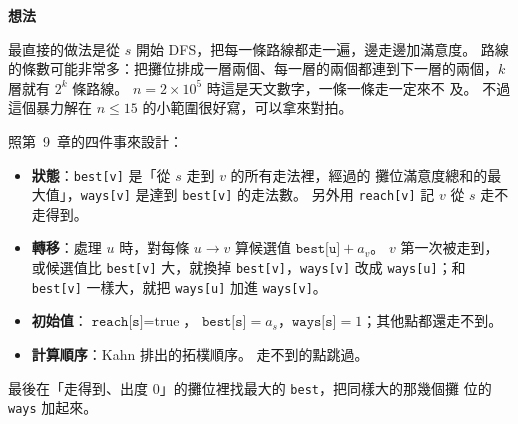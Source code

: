 \begin{center}
\label{fig:nightmarket}
\end{center}

\textbf{想法}

最直接的做法是從 $s$ 開始 DFS，把每一條路線都走一遍，邊走邊加滿意度。 路線
的條數可能非常多：把攤位排成一層兩個、每一層的兩個都連到下一層的兩個，$k$
層就有 $2^k$ 條路線。 $n = 2 \times 10^5$ 時這是天文數字，一條一條走一定來不
及。 不過這個暴力解在 $n \le 15$ 的小範圍很好寫，可以拿來對拍。

照第~9~章的四件事來設計：

\begin{itemize}
\item \textbf{狀態}：\texttt{best[v]} 是「從 $s$ 走到 $v$ 的所有走法裡，經過的
攤位滿意度總和的最大值」，\texttt{ways[v]} 是達到 \texttt{best[v]} 的走法數。
另外用 \texttt{reach[v]} 記 $v$ 從 $s$ 走不走得到。
\item \textbf{轉移}：處理 $u$ 時，對每條 $u \to v$ 算候選值
$\texttt{best[u]} + a_v$。 $v$ 第一次被走到，或候選值比 \texttt{best[v]}
大，就換掉 \texttt{best[v]}，\texttt{ways[v]} 改成 \texttt{ways[u]}；和
\texttt{best[v]} 一樣大，就把 \texttt{ways[u]} 加進 \texttt{ways[v]}。
\item \textbf{初始值}：$\texttt{reach[s]} = \text{true}$，
$\texttt{best[s]} = a_s$，$\texttt{ways[s]} = 1$；其他點都還走不到。
\item \textbf{計算順序}：Kahn 排出的拓樸順序。 走不到的點跳過。
\end{itemize}

最後在「走得到、出度 $0$」的攤位裡找最大的 \texttt{best}，把同樣大的那幾個攤
位的 \texttt{ways} 加起來。

